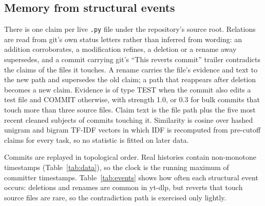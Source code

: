 \documentclass[11pt,a4paper]{article}
\begin{document}
\subsection{Memory from structural events}
There is one claim per live \texttt{.py} file under the repository's source root. Relations are read from git's own status letters rather than inferred from wording: an addition corroborates, a modification refines, a deletion or a rename away supersedes, and a commit carrying git's ``This reverts commit'' trailer contradicts the claims of the files it touches. A rename carries the file's evidence and text to the new path and supersedes the old claim; a path that reappears after deletion becomes a new claim. Evidence is of type TEST when the commit also edits a test file and COMMIT otherwise, with strength 1.0, or 0.3 for bulk commits that touch more than three source files. Claim text is the file path plus the five most recent cleaned subjects of commits touching it. Similarity is cosine over hashed unigram and bigram TF-IDF vectors in which IDF is recomputed from pre-cutoff claims for every task, so no statistic is fitted on later data.

Commits are replayed in topological order. Real histories contain non-monotone timestamps (Table~\ref{tab:data}), so the clock is the running maximum of committer timestamps. Table~\ref{tab:events} shows how often each structural event occurs: deletions and renames are common in yt-dlp, but reverts that touch source files are rare, so the contradiction path is exercised only lightly.

\begin{table}[t]\centering\small
\resizebox{\linewidth}{!}{}
\caption{Mined repositories and task selection. ``Eligible'' tasks are non-bot, non-revert, modify one to four source files that already have a claim, and occur after a warm-up of 35\% of the repository's source-touching commits; up to 400 evenly spaced tasks per repository are selected. Clock anomalies are commits whose recorded timestamp precedes the running clock. History of yt-dlp that predates its \texttt{yt\_dlp/} package directory is outside the source root and therefore not tracked.}
\label{tab:data}
\end{table}

\begin{table}[t]\centering\small
\resizebox{\linewidth}{!}{}
\caption{Structural events on source files in the full histories.}
\label{tab:events}
\end{table}
\end{document}
